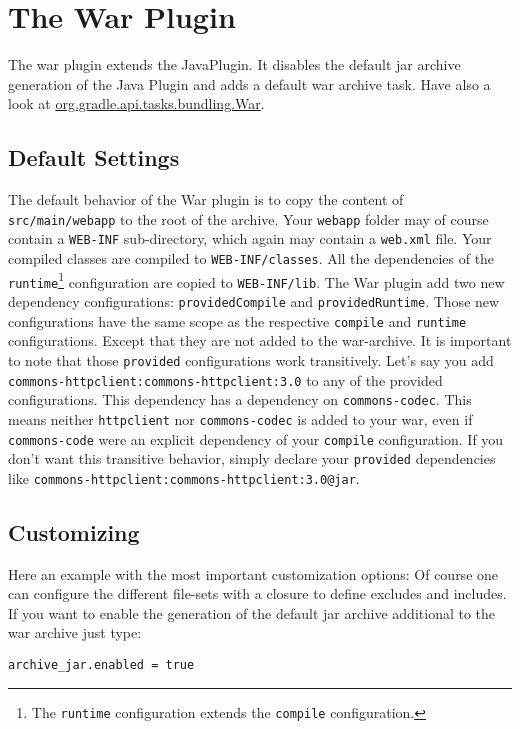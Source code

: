 \chapter{The War Plugin} %
\label{cha:the_war_plugin}
The war plugin extends the JavaPlugin. It disables the default jar archive generation of the Java Plugin and adds a default war archive task. Have also a look at \href{\API tasks/bundling/War.html}{org.gradle.api.tasks.bundling.War}.
\\
\section{Default Settings} %
\label{sec:default_settings}
The default behavior of the War plugin is to copy the content of \texttt{src/main/webapp} to the root of the archive. Your \texttt{webapp} folder may of course contain a \texttt{WEB-INF} sub-directory, which again may contain a \texttt{web.xml} file. Your compiled classes are compiled to \texttt{WEB-INF/classes}. All the dependencies of the \texttt{runtime}\footnote{The \texttt{runtime} configuration extends the \texttt{compile} configuration.} configuration are copied to \texttt{WEB-INF/lib}. The War plugin add two new dependency configurations: \texttt{providedCompile} and \texttt{providedRuntime}. Those new configurations have the same scope as the respective \texttt{compile} and \texttt{runtime} configurations. Except that they are not added to the war-archive. It is important to note that those \texttt{provided} configurations work transitively. Let's say you add \texttt{commons-httpclient:commons-httpclient:3.0} to any of the provided configurations. This dependency has a dependency on \texttt{commons-codec}. This means neither \texttt{httpclient} nor \texttt{commons-codec} is added to your war, even if \texttt{commons-code} were an explicit dependency of your \texttt{compile} configuration. If you don't want this transitive behavior, simply declare your \texttt{provided} dependencies like \texttt{commons-httpclient:commons-httpclient:3.0@jar}.
\section{Customizing} %
\label{sec:customizing}
Here an example with the most important customization options:
Of course one can configure the different file-sets with a closure to define excludes and includes.
\\

\noindent If you want to enable the generation of the default jar archive additional to the war archive just type:
\begin{Verbatim}
archive_jar.enabled = true
\end{Verbatim}

